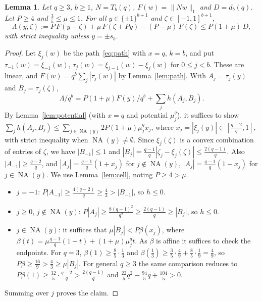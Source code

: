 \documentclass[11pt]{article}
\newtheorem{lemma}[theorem]{Lemma}
\theoremstyle{remark}
\newcommand{\NA}{\operatorname{NA}}
\begin{document}
\begin{lemma}\label{lem:local}
Let $q\ge3$, $b\ge1$, $N=T_b(q)$, $F(w)=\|Nw\|_1$ and $D=d_b(q)$. Let
$P\ge4$ and $\frac35\le\mu\le1$. For all $y\in\{\pm1\}^{b+1}$ and
$\zeta\in[-1,1]^{b+1}$,
\[
\Lambda(y,\zeta):=P\,F(y-\zeta)+\mu\,F(\zeta+Py)-(P-\mu)\,F(\zeta)
\le P(1+\mu)\,D,
\]
with strict inequality unless $y=\pm s_b$.
\end{lemma}
\begin{proof}
Let $\xi_j(w)$ be the path~\eqref{eq:path} with $x=q$, $k=b$, and put
$\tau_{-1}(w)=\xi_{-1}(w)$, $\tau_j(w)=\xi_{j-1}(w)-\xi_j(w)$ for $0\le j<b$.
These are linear, and $F(w)=q^b\sum_j|\tau_j(w)|$ by Lemma~\ref{lem:path}.
With $A_j=\tau_j(y)$ and $B_j=\tau_j(\zeta)$,
\[
\Lambda/q^b=P(1+\mu)F(y)/q^b+\textstyle\sum_jh(A_j,B_j).
\]
By Lemma~\ref{lem:potential} (with $x=q$ and potential $\mu^q_j$), it
suffices to show $\sum_jh(A_j,B_j)\le\sum_{j\in\NA(y)}2P(1+\mu)\mu^q_jx_j$,
where $x_j=|\xi_j(y)|\in[\frac{q-2}{q},1]$, with strict inequality when
$\NA(y)\ne\emptyset$. Since $\xi_j(\zeta)$ is a convex combination of entries
of $\zeta$, we have $|B_{-1}|\le1$ and
$|B_j|=\frac{q-1}{q}|\zeta_j-\xi_j(\zeta)|\le\frac{2(q-1)}{q}$. Also
$|A_{-1}|\ge\frac{q-2}{q}$, and $|A_j|=\frac{q-1}{q}(1+x_j)$ for
$j\notin\NA(y)$, $|A_j|=\frac{q-1}{q}(1-x_j)$ for $j\in\NA(y)$. We use
Lemma~\ref{lem:cell}, noting $P\ge4>\mu$.
\begin{itemize}
\item $j=-1$: $P|A_{-1}|\ge\frac{4(q-2)}{q}\ge\frac43>|B_{-1}|$, so $h\le0$.
\item $j\ge0$, $j\notin\NA(y)$: $P|A_j|\ge\frac{8(q-1)^2}{q^2}\ge
 \frac{2(q-1)}{q}\ge|B_j|$, so $h\le0$.
\item $j\in\NA(y)$: it suffices that $\mu|B_j|<P\beta(x_j)$, where
 $\beta(t)=\mu\frac{q-1}{q}(1-t)+(1+\mu)\mu^q_jt$. As $\beta$ is affine it
 suffices to check the endpoints. For $q=3$, $\beta(1)\ge\frac85\cdot\frac13$
 and $\beta(\frac13)\ge\frac35\cdot\frac49+\frac85\cdot\frac19=\frac49$, so
 $P\beta\ge\frac{16}{9}>\frac43\ge\mu|B_j|$. For general $q\ge3$ the same
 comparison reduces to $P\beta(1)\ge\frac{32}{5}\cdot\frac{q-2}{q}>
 \frac{2(q-1)}{q}$ and $\frac{22}5q^2-\frac{94}5q+\frac{104}5>0$.
\end{itemize}
Summing over $j$ proves the claim.
\end{proof}
\end{document}
